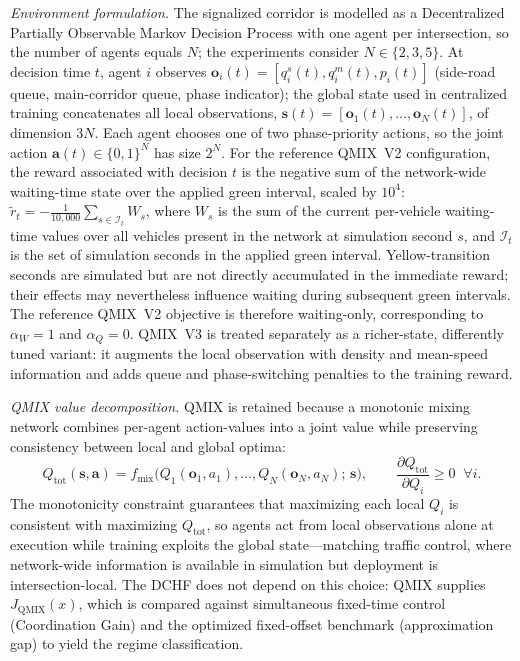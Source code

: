 \documentclass[12pt]{article}
\begin{document}
\textit{Environment formulation.} The signalized corridor is modelled as a
Decentralized Partially Observable Markov Decision Process with one agent per
intersection, so the number of agents equals $N$; the experiments consider
$N\in\{2,3,5\}$. At decision time $t$, agent $i$ observes
$\mathbf{o}_i(t)=[q_i^{s}(t),q_i^{m}(t),p_i(t)]$ (side-road queue, main-corridor
queue, phase indicator); the global state used in centralized training
concatenates all local observations, $\mathbf{s}(t)=[\mathbf{o}_1(t),\ldots,\mathbf{o}_N(t)]$,
of dimension $3N$. Each agent chooses one of two phase-priority actions, so the
joint action $\mathbf{a}(t)\in\{0,1\}^{N}$ has size $2^N$. For the reference QMIX~V2 configuration, the reward associated with decision
$t$ is the negative sum of the network-wide waiting-time state over the
applied green interval, scaled by $10^{4}$:
$\tilde r_t=-\tfrac{1}{10{,}000}\sum_{s\in\mathcal{I}_t} W_s$,
where $W_s$ is the sum of the current per-vehicle waiting-time values over all
vehicles present in the network at simulation second $s$, and $\mathcal{I}_t$
is the set of simulation seconds in the applied green interval.
Yellow-transition seconds are simulated but are not directly accumulated in
the immediate reward; their effects may nevertheless influence waiting during
subsequent green intervals. The reference QMIX~V2 objective is therefore waiting-only, corresponding
to $\alpha_W=1$ and $\alpha_Q=0$. QMIX~V3 is treated separately as a
richer-state, differently tuned variant: it augments the local observation
with density and mean-speed information and adds queue and phase-switching
penalties to the training reward.

\textit{QMIX value decomposition.} QMIX is retained because a monotonic mixing
network combines per-agent action-values into a joint value while preserving
consistency between local and global optima:
\begin{equation}
Q_{\mathrm{tot}}(\mathbf{s},\mathbf{a})=
f_{\mathrm{mix}}\!\bigl(Q_1(\mathbf{o}_1,a_1),\ldots,Q_N(\mathbf{o}_N,a_N);\,\mathbf{s}\bigr),
\qquad
\frac{\partial Q_{\mathrm{tot}}}{\partial Q_i}\geq 0\;\;\forall i .
\label{eq:qmix_total_value}
\end{equation}
The monotonicity constraint guarantees that maximizing each local $Q_i$ is
consistent with maximizing $Q_{\mathrm{tot}}$, so agents act from local
observations alone at execution while training exploits the global
state---matching traffic control, where network-wide information is available
in simulation but deployment is intersection-local. The DCHF does not depend on
this choice: QMIX supplies $J_{\mathrm{QMIX}}(x)$, which is compared against
simultaneous fixed-time control (Coordination Gain) and the optimized
fixed-offset benchmark (approximation gap) to yield the regime classification.
\end{document}
